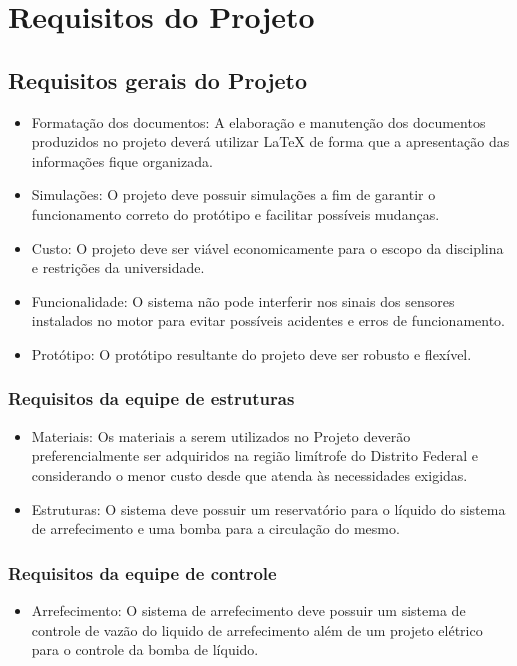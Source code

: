 \chapter{Requisitos do Projeto}

\section{Requisitos gerais do Projeto}

\begin{itemize}
\item Formatação dos documentos: A elaboração e manutenção dos documentos produzidos no projeto deverá utilizar LaTeX de forma que a apresentação das informações fique organizada.
\item Simulações: O projeto deve possuir simulações a fim de garantir o funcionamento correto do protótipo e facilitar possíveis mudanças.
\item Custo: O projeto deve ser viável economicamente para o escopo da disciplina e restrições da universidade.
\item Funcionalidade: O sistema não pode interferir nos sinais dos sensores instalados no motor para evitar possíveis acidentes e erros de funcionamento.
\item Protótipo: O protótipo resultante do projeto deve ser robusto e flexível.
\end{itemize}

\subsection{Requisitos da equipe de estruturas}
\begin{itemize}
\item Materiais: Os materiais a serem utilizados no Projeto deverão preferencialmente ser adquiridos na região limítrofe do Distrito Federal e considerando o menor custo desde que atenda às necessidades exigidas.
\item Estruturas: O sistema deve possuir um reservatório para o líquido do sistema de arrefecimento e uma bomba para a circulação do mesmo.
\end{itemize}

\subsection{Requisitos da equipe de controle}
\begin{itemize}
\item Arrefecimento: O sistema de arrefecimento deve possuir  um sistema de controle de vazão do liquido de arrefecimento além de um projeto elétrico para o controle da bomba de líquido.
\end{itemize}

